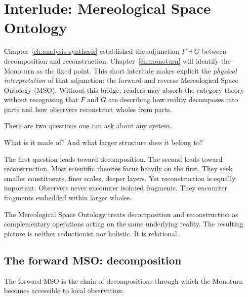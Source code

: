 
\chapter{Interlude: Mereological Space Ontology}
\label{ch:mso}

\begin{WhyChapter}
  Chapter~\ref{ch:analysis-synthesis} established the adjunction
  $F \dashv G$ between decomposition and reconstruction.
  Chapter~\ref{ch:monoturn} will identify the Monoturn as the
  fixed point.
  This short interlude makes explicit the \emph{physical
  interpretation} of that adjunction: the forward and reverse
  Mereological Space Ontology (MSO).
  Without this bridge, readers may absorb the category theory
  without recognising that $F$ and $G$ are describing how
  reality decomposes into parts and how observers reconstruct
  wholes from parts.
\end{WhyChapter}


\begin{ChapterIntro}
There are two questions one can ask about any system.

What is it made of? And what larger structure does it belong to?

The first question leads toward decomposition. The second leads toward reconstruction. Most scientific theories focus heavily on the first. They seek smaller constituents, finer scales, deeper layers. Yet reconstruction is equally important. Observers never encounter isolated fragments. They encounter fragments embedded within larger wholes.

The Mereological Space Ontology treats decomposition and reconstruction as complementary operations acting on the same underlying reality. The resulting picture is neither reductionist nor holistic. It is relational.
\end{ChapterIntro}

\section{The forward MSO: decomposition}

The forward MSO is the chain of decompositions through which
the Monoturn becomes accessible to local observation:

